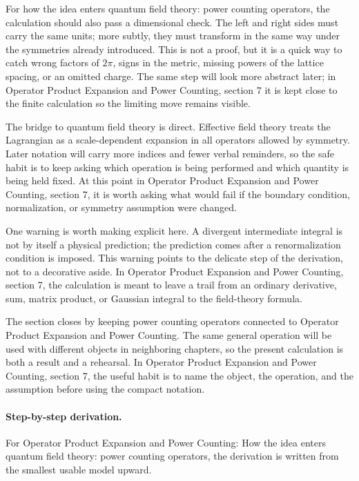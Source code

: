 For how the idea enters quantum field theory: power counting operators, the calculation should also pass a dimensional check.  The left and right sides must carry the same units; more subtly, they must transform in the same way under the symmetries already introduced.  This is not a proof, but it is a quick way to catch wrong factors of \(2\pi\), signs in the metric, missing powers of the lattice spacing, or an omitted charge.  The same step will look more abstract later; in Operator Product Expansion and Power Counting, section 7 it is kept close to the finite calculation so the limiting move remains visible.

The bridge to quantum field theory is direct.  Effective field theory treats the Lagrangian as a scale-dependent expansion in all operators allowed by symmetry.  Later notation will carry more indices and fewer verbal reminders, so the safe habit is to keep asking which operation is being performed and which quantity is being held fixed.  At this point in Operator Product Expansion and Power Counting, section 7, it is worth asking what would fail if the boundary condition, normalization, or symmetry assumption were changed.

One warning is worth making explicit here.  A divergent intermediate integral is not by itself a physical prediction; the prediction comes after a renormalization condition is imposed.  This warning points to the delicate step of the derivation, not to a decorative aside.  In Operator Product Expansion and Power Counting, section 7, the calculation is meant to leave a trail from an ordinary derivative, sum, matrix product, or Gaussian integral to the field-theory formula.

The section closes by keeping power counting operators connected to Operator Product Expansion and Power Counting.  The same general operation will be used with different objects in neighboring chapters, so the present calculation is both a result and a rehearsal.  In Operator Product Expansion and Power Counting, section 7, the useful habit is to name the object, the operation, and the assumption before using the compact notation.



\paragraph{Step-by-step derivation.}

For Operator Product Expansion and Power Counting: How the idea enters quantum field theory: power counting operators, the derivation is written from the smallest usable model upward.

